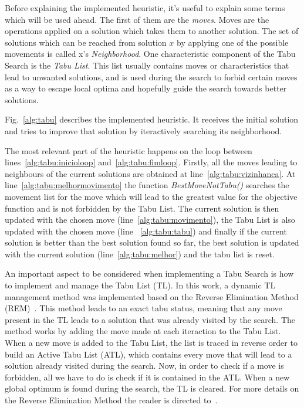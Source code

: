 Before explaining the implemented heuristic, it's useful to explain some terms which will be used ahead. The first of them are the 
\textit{moves}. Moves are the operations applied on a solution which takes them to another solution. The set of solutions which can be reached
from solution $x$ by applying one of the possible movements is called x's \textit{Neighborhood}. One characteristic component of the Tabu Search is the
\textit{Tabu List}. This list usually contains moves or characteristics that lead to unwanted solutions, and is used during the search to forbid certain moves
as a way to escape local optima and hopefully guide the search towards better solutions.

Fig.~\ref{alg:tabu} describes the implemented heuristic. It receives the 
initial solution and tries to improve that solution by iteractively searching its neighborhood.


The most relevant part of the heuristic happens on the loop between lines~\ref{alg:tabu:inicioloop}
and~\ref{alg:tabu:fimloop}. Firstly, all the moves leading to neighbours of the current solutions are obtained at 
line~\ref{alg:tabu:vizinhanca}. At line~\ref{alg:tabu:melhormovimento} the function \textit{BestMoveNotTabu()} searches
the movement list for the move which will lead to the greatest value for the objective function and is not forbidden
by the Tabu List. The current solution is then updated with the chosen move (line~\ref{alg:tabu:movimento}), 
the Tabu List is also updated with the chosen move (line ~\ref{alg:tabu:tabu}) 
and finally if the current solution is better than the best solution found so far, the best solution is updated 
with the current solution (line~\ref{alg:tabu:melhor}) and the tabu list is reset.

An important aspect to be considered when implementing a Tabu Search is how to implement and manage the Tabu List (TL).
In this work, a dynamic TL management method was implemented based on the Reverse Elimination Method (REM)~\cite{glover1990tabup2}. This method leads to
an exact tabu status, meaning that any move present in the TL leads to a solution that was already visited by the search. The method works
by adding the move made at each iteraction to the Tabu List. When a new move is added to the Tabu List, the list is traced in reverse order
to build an Active Tabu List (ATL), which contains every move that will lead to a solution already visited during the search. Now, in order to check if a move
is forbidden, all we have to do is check if it is contained in the ATL. When a new global optimum is found during the search, the TL is cleared.
For more details on the Reverse Elimination Method the reader is directed to~\cite{glover1990tabup2}.






















